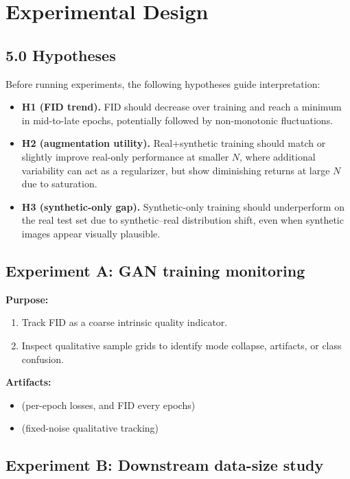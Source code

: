 \section{Experimental Design}

\subsection*{5.0 Hypotheses}

Before running experiments, the following hypotheses guide interpretation:
\begin{itemize}
\item \textbf{H1 (FID trend).} FID should decrease over training and reach a minimum in mid-to-late epochs, potentially followed by non-monotonic fluctuations.
\item \textbf{H2 (augmentation utility).} Real+synthetic training should match or slightly improve real-only performance at smaller \(N\), where additional variability can act as a regularizer, but show diminishing returns at large \(N\) due to saturation.
\item \textbf{H3 (synthetic-only gap).} Synthetic-only training should underperform on the real test set due to synthetic--real distribution shift, even when synthetic images appear visually plausible.
\end{itemize}

\subsection{Experiment A: GAN training monitoring}

\textbf{Purpose:}
\begin{enumerate}
\item Track FID as a coarse intrinsic quality indicator.
\item Inspect qualitative sample grids to identify mode collapse, artifacts, or class confusion.
\end{enumerate}

\textbf{Artifacts:}
\begin{itemize}
\item {} (per-epoch losses, and FID every  epochs)
\item {} (fixed-noise qualitative tracking)
\end{itemize}

\subsection{Experiment B: Downstream data-size study}

